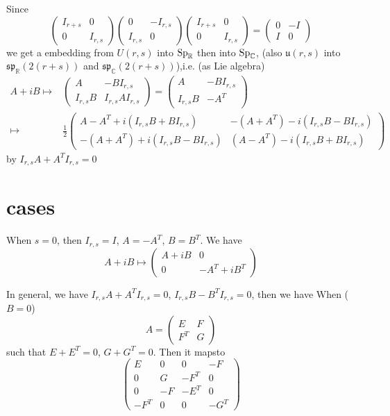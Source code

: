 \documentclass[12pt]{article}
\def\bR{{\mathbb{R}}}
\def\bC{{\mathbb{C}}}
\def\sp{{\mathfrak{sp}}}
\def\Sp{{\rm Sp}}
\def\fuu{\mathfrak{u}}
\begin{document}
Since
\[
\begin{pmatrix}
I_{r+s} & 0\\
0 & I_{r,s}
\end{pmatrix}
\begin{pmatrix}
0 & -I_{r,s}\\
I_{r,s} & 0
\end{pmatrix}
\begin{pmatrix}
I_{r+s} & 0\\
0 & I_{r,s}
\end{pmatrix}
= \begin{pmatrix}
0&-I\\
I & 0
\end{pmatrix}
\]
we get a embedding from $U(r,s)$ into $\Sp_\bR$ then into $\Sp_\bC$,
(also $\fuu(r,s)$ into 
$\sp_\bR(2(r+s))$ and $\sp_\bC(2(r+s))$),i.e. (as Lie algebra)
\[
\begin{split}
A+iB\mapsto &
\begin{pmatrix}
A & -B I_{r,s}\\
I_{r,s} B & I_{r,s}AI_{r,s}
\end{pmatrix}
=
\begin{pmatrix}
A & -B I_{r,s}\\
I_{r,s} B & -A^T
\end{pmatrix}\\
\mapsto &\frac{1}{2}
\begin{pmatrix}
A-A^T + i(I_{r,s}B + BI_{r,s}) & - (A+A^T) - i(I_{r,s}B-BI_{r,s})\\
-(A+A^T) + i(I_{r,s}B - BI_{r,s})& (A-A^T) - i(I_{r,s}B+BI_{r,s})
\end{pmatrix}
\end{split}
\]
by $I_{r,s} A + A^TI_{r,s} = 0$

\section{cases}
When $s=0$, then $I_{r,s} = I$, $A=-A^T$, $B=B^T$.
We have 
\[
A+iB \mapsto 
\begin{pmatrix}
A + iB & 0\\
0& -A^T +iB^T
\end{pmatrix}
\]

In general, 
we have $I_{r,s}A + A^T I_{r,s} = 0$, $I_{r,s}B -B^T I_{r,s} =0$, then we have
When ($B=0$)
\[
A = \begin{pmatrix}
E & F\\
F^T & G
\end{pmatrix}
\] 
such that $E+E^T=0$, $G+G^T=0$. 
Then it mapsto 
\[
\begin{pmatrix}
E & 0 & 0 & -F \\
0 & G & -F^T & 0 \\
0 & -F& -E^T & 0 \\
-F^T & 0& 0 & -G^T 
\end{pmatrix}
\]
\end{document}
